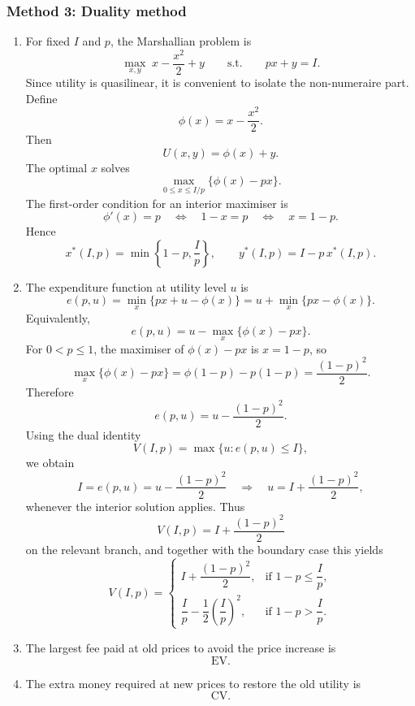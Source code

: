 \documentclass[12pt]{article}
\begin{document}
\newpage
\subsubsection{Method 3: Duality method}
\begin{enumerate}[label=(\alph*)]
    \item
    For fixed \(I\) and \(p\), the Marshallian problem is
    \[
    \max_{x,y}\; x-\frac{x^2}{2}+y
    \qquad\text{s.t.}\qquad
    px+y=I.
    \]
    Since utility is quasilinear, it is convenient to isolate the non-numeraire part. Define
    \[
    \phi(x)=x-\frac{x^2}{2}.
    \]
    Then
    \[
    U(x,y)=\phi(x)+y.
    \]
    The optimal \(x\) solves
    \[
    \max_{0\le x\le I/p}\{\phi(x)-px\}.
    \]
    The first-order condition for an interior maximiser is
    \[
    \phi'(x)=p
    \quad\Longleftrightarrow\quad
    1-x=p
    \quad\Longleftrightarrow\quad
    x=1-p.
    \]
    Hence
    \[
    \boxed{
    x^*(I,p)=\min\left\{1-p,\frac{I}{p}\right\},
    \qquad
    y^*(I,p)=I-p\,x^*(I,p).
    }
    \]

    \item
    The expenditure function at utility level \(u\) is
    \[
    e(p,u)=\min_x\{px+u-\phi(x)\}
    =
    u+\min_x\{px-\phi(x)\}.
    \]
    Equivalently,
    \[
    e(p,u)=u-\max_x\{\phi(x)-px\}.
    \]
    For \(0<p\le 1\), the maximiser of \(\phi(x)-px\) is \(x=1-p\), so
    \[
    \max_x\{\phi(x)-px\}
    =
    \phi(1-p)-p(1-p)
    =
    \frac{(1-p)^2}{2}.
    \]
    Therefore
    \[
    e(p,u)=u-\frac{(1-p)^2}{2}.
    \]
    Using the dual identity
    \[
    V(I,p)=\max\{u:e(p,u)\le I\},
    \]
    we obtain
    \[
    I=e(p,u)
    =u-\frac{(1-p)^2}{2}
    \quad\Longrightarrow\quad
    u=I+\frac{(1-p)^2}{2},
    \]
    whenever the interior solution applies. Thus
    \[
    \boxed{
    V(I,p)=I+\frac{(1-p)^2}{2}
    }
    \]
    on the relevant branch, and together with the boundary case this yields
    \[
    \boxed{
    V(I,p)=
    \begin{cases}
    I+\dfrac{(1-p)^2}{2}, & \text{if } 1-p\le \dfrac{I}{p},\\[1.2ex]
    \dfrac{I}{p}-\dfrac12\left(\dfrac{I}{p}\right)^2, & \text{if } 1-p>\dfrac{I}{p}.
    \end{cases}}
    \]

    \item
    The largest fee paid at old prices to avoid the price increase is
    \[
    \boxed{\text{EV}.}
    \]

    \item
    The extra money required at new prices to restore the old utility is
    \[
    \boxed{\text{CV}.}
    \]


\end{enumerate}
\end{document}
